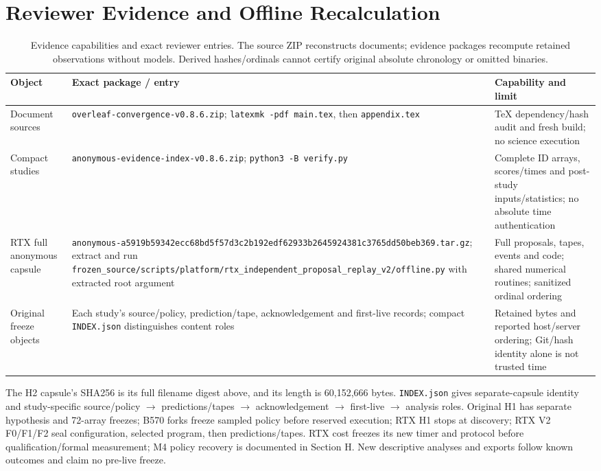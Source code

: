 \section{Reviewer Evidence and Offline Recalculation}
\label{app:evidence}
\begin{table}[t]
\caption{Evidence capabilities and exact reviewer entries. The source ZIP reconstructs documents; evidence packages recompute retained observations without models. Derived hashes/ordinals cannot certify original absolute chronology or omitted binaries.}
\label{tab:evidenceentries}
\centering
\begin{tabular}{@{}p{1.55in}p{2.80in}p{1.9in}@{}}
\toprule
Object & Exact package / entry & Capability and limit \\
\midrule
Document sources & \nolinkurl{overleaf-convergence-v0.8.6.zip}; \texttt{latexmk -pdf main.tex}, then \texttt{appendix.tex} & TeX dependency/hash audit and fresh build; no science execution \\
Compact studies & \nolinkurl{anonymous-evidence-index-v0.8.6.zip}; \texttt{python3 -B verify.py} & Complete ID arrays, scores/times and post-study inputs/statistics; no absolute time authentication \\
RTX full anonymous capsule & \nolinkurl{anonymous-a5919b59342ecc68bd5f57d3c2b192edf62933b2645924381c3765dd50beb369.tar.gz}; extract and run \nolinkurl{frozen_source/scripts/platform/rtx_independent_proposal_replay_v2/offline.py} with extracted root argument & Full proposals, tapes, events and code; shared numerical routines; sanitized ordinal ordering \\
Original freeze objects & Each study's source/policy, prediction/tape, acknowledgement and first-live records; compact \texttt{INDEX.json} distinguishes content roles & Retained bytes and reported host/server ordering; Git/hash identity alone is not trusted time \\
\bottomrule
\end{tabular}
\end{table}
The H2 capsule's SHA256 is its full filename digest above, and its length is 60,152,666 bytes. \texttt{INDEX.json} gives separate-capsule identity and study-specific source/policy $\to$ predictions/tapes $\to$ acknowledgement $\to$ first-live $\to$ analysis roles. Original H1 has separate hypothesis and 72-array freezes; B570 forks freeze sampled policy before reserved execution; RTX H1 stops at discovery; RTX V2 F0/F1/F2 seal configuration, selected program, then predictions/tapes. RTX cost freezes its new timer and protocol before qualification/formal measurement; M4 policy recovery is documented in Section H. New descriptive analyses and exports follow known outcomes and claim no pre-live freeze.

